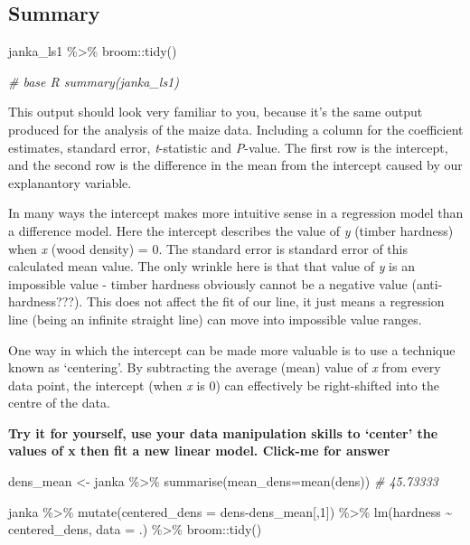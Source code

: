 \documentclass[
]{book}
\newenvironment{Shaded}{\begin{snugshade}}{\end{snugshade}}
\newcommand{\AttributeTok}[1]{\textcolor[rgb]{0.77,0.63,0.00}{#1}}
\newcommand{\CommentTok}[1]{\textcolor[rgb]{0.56,0.35,0.01}{\textit{#1}}}
\newcommand{\DecValTok}[1]{\textcolor[rgb]{0.00,0.00,0.81}{#1}}
\newcommand{\FunctionTok}[1]{\textcolor[rgb]{0.00,0.00,0.00}{#1}}
\newcommand{\NormalTok}[1]{#1}
\newcommand{\OtherTok}[1]{\textcolor[rgb]{0.56,0.35,0.01}{#1}}
\newcommand{\SpecialCharTok}[1]{\textcolor[rgb]{0.00,0.00,0.00}{#1}}
\begin{document}
\hypertarget{summary-4}{%
\subsection{Summary}\label{summary-4}}

\begin{Shaded}
\begin{Highlighting}[]
\NormalTok{janka\_ls1 }\SpecialCharTok{\%\textgreater{}\%} 
\NormalTok{  broom}\SpecialCharTok{::}\FunctionTok{tidy}\NormalTok{()}

\CommentTok{\# base R summary(janka\_ls1)}
\end{Highlighting}
\end{Shaded}

This output should look very familiar to you, because it's the same output produced for the analysis of the maize data. Including a column for the coefficient estimates, standard error, \emph{t}-statistic and \emph{P}-value. The first row is the intercept, and the second row is the difference in the mean from the intercept caused by our explanantory variable.

In many ways the intercept makes more intuitive sense in a regression model than a difference model. Here the intercept describes the value of \emph{y} (timber hardness) when \emph{x} (wood density) = 0. The standard error is standard error of this calculated mean value. The only wrinkle here is that that value of \emph{y} is an impossible value - timber hardness obviously cannot be a negative value (anti-hardness???). This does not affect the fit of our line, it just means a regression line (being an infinite straight line) can move into impossible value ranges.

One way in which the intercept can be made more valuable is to use a technique known as `centering'. By subtracting the average (mean) value of \emph{x} from every data point, the intercept (when \emph{x} is 0) can effectively be right-shifted into the centre of the data.

\textbf{Try it for yourself, use your data manipulation skills to `center' the values of x then fit a new linear model. Click-me for answer}

\begin{Shaded}
\begin{Highlighting}[]
\NormalTok{dens\_mean }\OtherTok{\textless{}{-}}\NormalTok{ janka }\SpecialCharTok{\%\textgreater{}\%} 
  \FunctionTok{summarise}\NormalTok{(}\AttributeTok{mean\_dens=}\FunctionTok{mean}\NormalTok{(dens))}
\CommentTok{\# 45.73333}

\NormalTok{janka }\SpecialCharTok{\%\textgreater{}\%} 
  \FunctionTok{mutate}\NormalTok{(}\AttributeTok{centered\_dens =}\NormalTok{ dens}\SpecialCharTok{{-}}\NormalTok{dens\_mean[,}\DecValTok{1}\NormalTok{]) }\SpecialCharTok{\%\textgreater{}\%} 
  \FunctionTok{lm}\NormalTok{(hardness }\SpecialCharTok{\textasciitilde{}}\NormalTok{ centered\_dens, }\AttributeTok{data =}\NormalTok{ .) }\SpecialCharTok{\%\textgreater{}\%} 
\NormalTok{  broom}\SpecialCharTok{::}\FunctionTok{tidy}\NormalTok{()}
\end{Highlighting}
\end{Shaded}
\end{document}
